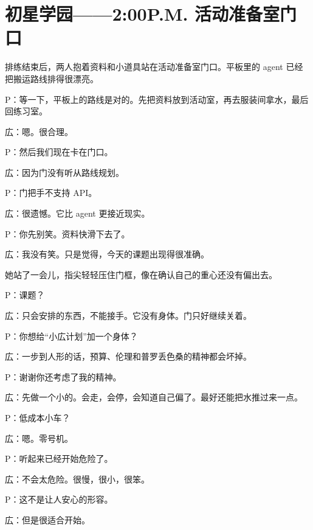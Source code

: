 

\section*{初星学园——2:00P.M. 活动准备室门口}
{}

排练结束后，两人抱着资料和小道具站在活动准备室门口。平板里的 agent 已经把搬运路线排得很漂亮。

P：等一下，平板上的路线是对的。先把资料放到活动室，再去服装间拿水，最后回练习室。

広：嗯。很合理。

P：然后我们现在卡在门口。

広：因为门没有听从路线规划。

P：门把手不支持 API。

広：很遗憾。它比 agent 更接近现实。

P：你先别笑。资料快滑下去了。

広：我没有笑。只是觉得，今天的课题出现得很准确。

她站了一会儿，指尖轻轻压住门框，像在确认自己的重心还没有偏出去。

P：课题？

広：只会安排的东西，不能接手。它没有身体。门只好继续关着。

P：你想给“小広计划”加一个身体？

広：一步到人形的话，预算、伦理和普罗丢色桑的精神都会坏掉。

P：谢谢你还考虑了我的精神。

広：先做一个小的。会走，会停，会知道自己偏了。最好还能把水推过来一点。

P：低成本小车？

広：嗯。零号机。

P：听起来已经开始危险了。

広：不会太危险。很慢，很小，很笨。

P：这不是让人安心的形容。

広：但是很适合开始。

\clearpage


